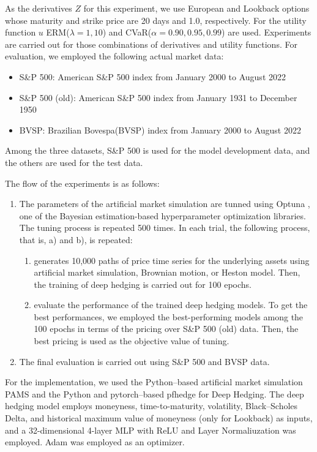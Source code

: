 As the derivatives $Z$ for this experiment, we use European and Lookback options whose maturity and strike price are 20 days and 1.0, respectively.
For the utility function $u$ ERM($\lambda = 1, 10$) and CVaR($\alpha = 0.90, 0.95, 0.99$) are used.
Experiments are carried out for those combinations of derivatives and utility functions.
For evaluation, we employed the following actual market data:
\begin{itemize}
    \item S\&P 500: American S\&P 500 index from January 2000 to August 2022
    \item S\&P 500 (old): American S\&P 500 index from January 1931 to December 1950
    \item BVSP: Brazilian Bovespa(BVSP) index from January 2000 to August 2022
\end{itemize}
Among the three datasets, S\&P 500 is used for the model development data, and the others are used for the test data.

The flow of the experiments is as follows:
\begin{enumerate}
    \item The parameters of the artificial market simulation are tunned using Optuna \cite{optuna_2019}, one of the Bayesian estimation-based hyperparameter optimization libraries. The tuning process is repeated 500 times. In each trial, the following process, that is, a) and b), is repeated:
          \begin{enumerate}
              \item generates 10,000 paths of price time series for the underlying assets using artificial market simulation, Brownian motion, or Heston model. Then, the training of deep hedging is carried out for 100 epochs.
              \item evaluate the performance of the trained deep hedging models. To get the best performances, we employed the best-performing models among the 100 epochs in terms of the pricing over S\&P 500 (old) data. Then, the best pricing is used as the objective value of tuning.
          \end{enumerate}
    \item The final evaluation is carried out using S\&P 500 and BVSP data.
\end{enumerate}

For the implementation, we used the Python--based artificial market simulation PAMS\cite{Hirano2023-pams} and the Python and pytorch--based pfhedge\cite{pfhedge} for Deep Hedging.
The deep hedging model employs moneyness, time-to-maturity, volatility, Black--Scholes Delta, and historical maximum value of moneyness (only for Lookback) as inputs, and a 32-dimensional 4-layer MLP with ReLU and Layer Normaliuzation\cite{Ba2016} was employed.
Adam was employed as an optimizer.

